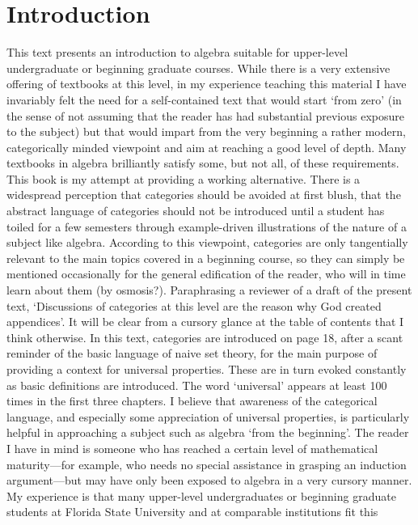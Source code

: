 \chapter*{Introduction}\label{chap:intro}

This text presents an introduction to algebra suitable for upper-level
undergraduate or beginning graduate courses. While there is a very
extensive offering of textbooks at this level, in my experience
teaching this material I have invariably felt the need for a
self-contained text that would start `from zero' (in the sense of not
assuming that the reader has had substantial previous exposure to the
subject) but that would impart from the very beginning a rather
modern, categorically minded viewpoint and aim at reaching a good
level of depth. Many textbooks in algebra brilliantly satisfy some,
but not all, of these requirements. This book is my attempt at
providing a working alternative.  There is a widespread perception
that categories should be avoided at first blush, that the abstract
language of categories should not be introduced until a student has
toiled for a few semesters through example-driven illustrations of the
nature of a subject like algebra. According to this viewpoint,
categories are only tangentially relevant to the main topics covered
in a beginning course, so they can simply be mentioned occasionally
for the general edification of the reader, who will in time learn
about them (by osmosis?). Paraphrasing a reviewer of a draft of the
present text, `Discussions of categories at this level are the reason
why God created appendices'.  It will be clear from a cursory glance
at the table of contents that I think otherwise. In this text,
categories are introduced on page 18, after a scant reminder of the
basic language of naive set theory, for the main purpose of providing
a context for universal properties. These are in turn evoked
constantly as basic definitions are introduced. The word `universal'
appears at least 100 times in the first three chapters.  I believe
that awareness of the categorical language, and especially some
appreciation of universal properties, is particularly helpful in
approaching a subject such as algebra `from the beginning'. The reader
I have in mind is someone who has reached a certain level of
mathematical maturity---for example, who needs no special assistance
in grasping an induction argument---but may have only been exposed to
algebra in a very cursory manner. My experience is that many
upper-level undergraduates or beginning graduate students at Florida
State University and at comparable institutions fit this

